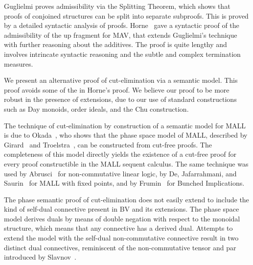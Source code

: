 Guglielmi \cite[\S4.1]{Guglielmi14:di} proves admissibility via the Splitting Theorem, which shows that proofs of conjoined structures can be split into separate subproofs. This is proved by a detailed syntactic analysis of proofs. Horne~\cite{Horne15:mav} gave a syntactic proof of the admissibility of the up fragment for MAV, that extends Guglielmi's technique with further reasoning about the additives. The proof is quite lengthy and involves intrincate syntactic reasoning and the subtle and complex termination measures.

We present an alternative proof of cut-elimination via a semantic model. This proof avoids some of the in Horne's proof. We believe our proof to be more robust in the presence of extensions, due to our use of standard constructions such as Day monoids, order ideals, and the Chu construction.

The technique of cut-elimination by construction of a semantic model for MALL is due to Okada~\cite{Okada99:psc}, who shows that the phase space model of MALL, described by Girard~\cite[\S4.1]{Girard87:ll} and Troelstra~\cite[]{Troelstra92:lll}, can be constructed from cut-free proofs.
The completeness of this model directly yields the existence of a cut-free proof for every proof constructible in the MALL sequent calculus.
The same technique was used by Abrusci~\cite{Abrusci91:psc} for non-commutative linear logic, by De, Jafarrahmani, and Saurin~\cite{De22:psc} for MALL with fixed points, and by Frumin~\cite{Frumin22:psc} for Bunched Implications.

The phase semantic proof of cut-elimination does not easily extend to include the kind of self-dual connective present in BV and its extensions.
The phase space model derives duals by means of double negation with respect to the monoidal structure, which means that any connective has a derived dual. Attempts to extend the model with the self-dual non-commutative connective result in two distinct dual connectives, reminiscent of the non-commutative tensor and par introduced by Slavnov~\cite{Slavnov19:scmll}.

